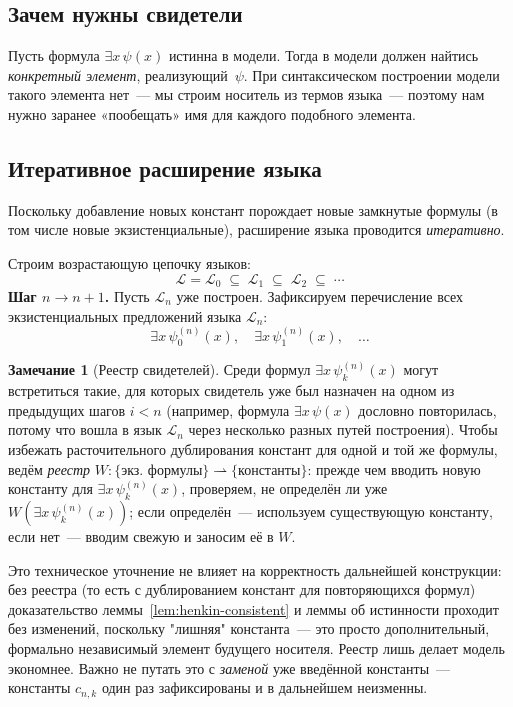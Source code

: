 \documentclass[12pt, a4paper]{article}
\theoremstyle{plain}
\theoremstyle{definition}
\newtheorem{remark}[theorem]{Замечание}
\newcommand{\Lang}{\mathcal{L}}
\begin{document}
\subsection{Зачем нужны свидетели}

Пусть формула $\exists x\,\psi(x)$ истинна в модели.
Тогда в модели должен найтись \emph{конкретный элемент},
реализующий~$\psi$. При синтаксическом построении модели такого элемента нет~---
мы строим носитель из термов языка~--- поэтому нам нужно заранее
«пообещать» имя для каждого подобного элемента.

\subsection{Итеративное расширение языка}

Поскольку добавление новых констант порождает новые замкнутые формулы
(в том числе новые экзистенциальные), расширение языка проводится
\emph{итеративно}.

Строим возрастающую цепочку языков:
\[
  \Lang = \Lang_0 \;\subseteq\; \Lang_1 \;\subseteq\; \Lang_2 \;\subseteq\; \cdots
\]
\textbf{Шаг $n \to n+1$.}
Пусть $\Lang_n$ уже построен. Зафиксируем перечисление
всех экзистенциальных предложений языка $\Lang_n$:
\[
  \exists x\,\psi_0^{(n)}(x),\quad \exists x\,\psi_1^{(n)}(x),\quad \ldots
\]

\begin{remark}[Реестр свидетелей]\label{rem:registry}
Среди формул $\exists x\,\psi_k^{(n)}(x)$ могут встретиться такие, для которых
свидетель уже был назначен на одном из предыдущих шагов $i < n$ (например,
формула $\exists x\,\psi(x)$ дословно повторилась, потому что вошла в язык
$\Lang_n$ через несколько разных путей построения). Чтобы избежать
расточительного дублирования констант для одной и той же формулы, ведём
\emph{реестр} $W \colon \{\text{экз.\ формулы}\} \rightharpoonup \{\text{константы}\}$:
прежде чем вводить новую константу для $\exists x\,\psi_k^{(n)}(x)$, проверяем,
не определён ли уже $W(\exists x\,\psi_k^{(n)}(x))$; если определён~--- используем
существующую константу, если нет~--- вводим свежую и заносим её в $W$.

Это техническое уточнение не влияет на корректность дальнейшей конструкции:
без реестра (то есть с дублированием констант для повторяющихся формул)
доказательство леммы~\ref{lem:henkin-consistent} и леммы об истинности
проходит без изменений, поскольку "лишняя" константа~--- это просто
дополнительный, формально независимый элемент будущего носителя.
Реестр лишь делает модель экономнее. Важно не путать это с
\emph{заменой} уже введённой константы~--- константы $c_{n,k}$ один раз
зафиксированы и в дальнейшем неизменны.
\end{remark}
\end{document}
